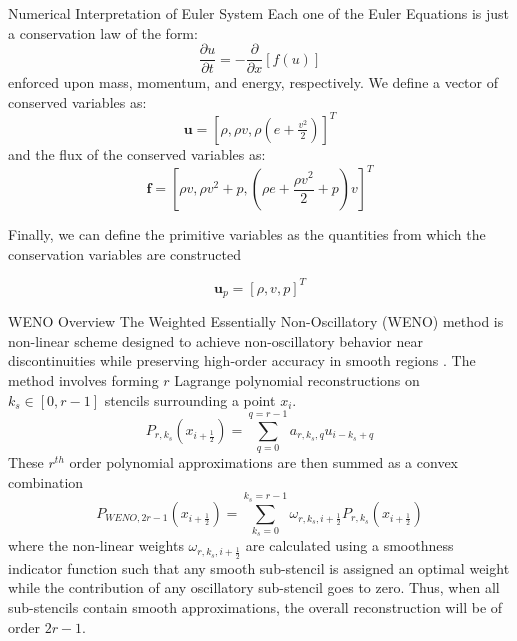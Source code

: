\documentclass[9pt]{beamer}
\begin{document}

\begin{frame}{Numerical Interpretation of Euler System}
Each one of the Euler Equations is just a conservation law of the form:
\begin{equation}
	\frac{\partial u}{\partial t}=-\frac{\partial}{\partial x}[f(u)]\label{eq:ConservationLaw}
\end{equation}
 enforced upon mass, momentum, and energy, respectively. We define a vector of conserved variables as: $$\textbf{u}=[\rho,\rho v,\rho(e+\tfrac{v^2}{2})]^T$$ and the flux of the conserved variables as:
\begin{equation}
	\textbf{f} = [\rho v, \rho v^2 + p, (\rho e +\frac{\rho v^2}{2}+p)v]^T\label{eq: Flux Functions}
\end{equation}

Finally, we can define the primitive variables as the quantities from which the conservation variables are constructed

\begin{equation}
\textbf{u}_p=[\rho,v,p]^T
\end{equation}

\end{frame}


\begin{frame}{WENO Overview}
The Weighted Essentially Non-Oscillatory (WENO) method is non-linear scheme designed to achieve non-oscillatory behavior near discontinuities while preserving high-order accuracy in smooth regions \cite{Jiang96}.  The method involves forming $r$ Lagrange polynomial reconstructions on $k_s\in[0,r-1]$ stencils surrounding a point $x_i$.
\begin{equation}
P_{r,k_s}(x_{i+\tfrac{1}{2}}) = \sum_{q=0}^{q=r-1}a_{r,k_s,q}u_{i-k_s+q}\label{eq:PolynomialReconstruction}
\end{equation}
These $r^{th}$ order polynomial approximations are then summed as a convex combination
\begin{equation}
P_{WENO, 2r-1}(x_{i+\frac{1}{2}})=\sum_{k_s=0}^{k_s=r-1}\omega_{r,k_s,i+\frac{1}{2}}P_{r,k_s}(x_{i+\tfrac{1}{2}})\label{eq:WenoEquation}
\end{equation}
where the non-linear weights $\omega_{r,k_s,i+\frac{1}{2}}$ are calculated using a smoothness indicator function such that any smooth sub-stencil is assigned an optimal weight while the contribution of any oscillatory sub-stencil goes to zero.  Thus, when all sub-stencils contain smooth approximations, the overall reconstruction will be of order $2r-1$.

\end{frame}
\end{document}

